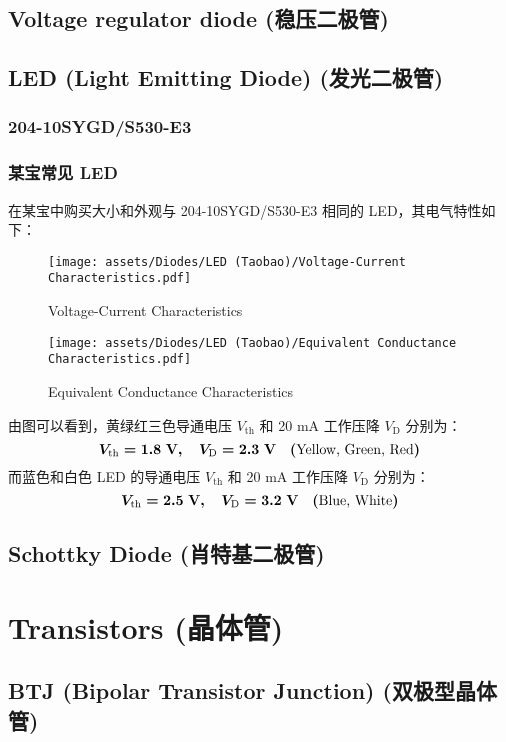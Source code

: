 \documentclass[UTF8]{report}
\begin{document}
\section{Voltage regulator diode (稳压二极管)}
\section{LED (Light Emitting Diode) (发光二极管)}
\subsection{204-10SYGD/S530-E3}
\subsection{某宝常见 LED}
在某宝中购买大小和外观与 204-10SYGD/S530-E3 相同的 LED，其电气特性如下：
\begin{figure}[H]\centering
    \texttt{[image: assets/Diodes/LED (Taobao)/Voltage-Current Characteristics.pdf]}
    \caption{Voltage-Current Characteristics}
\end{figure}
\begin{figure}[H]\centering
    \texttt{[image: assets/Diodes/LED (Taobao)/Equivalent Conductance Characteristics.pdf]}
    \caption{Equivalent Conductance Characteristics}
\end{figure}
由图可以看到，黄绿红三色导通电压 $V_\text{th}$ 和 20 mA 工作压降 $V_\text{D}$ 分别为：
\begin{equation}
\boldmath
V_\text{th} = 1.8 \ \mathrm{V},\quad V_\text{D} = 2.3 \ \mathrm{V} \quad (\text{Yellow, Green, Red})
\end{equation}
而蓝色和白色 LED 的导通电压 $V_\text{th}$ 和 20 mA 工作压降 $V_\text{D}$ 分别为：
\begin{equation}
\boldmath
V_\text{th} = 2.5 \ \mathrm{V},\quad V_\text{D} = 3.2 \ \mathrm{V} \quad (\text{Blue, White})
\end{equation}

\section{Schottky Diode (肖特基二极管)}

\chapter{Transistors (晶体管)}\thispagestyle{fancy}
\section{BTJ (Bipolar Transistor Junction) (双极型晶体管)}
\end{document}
